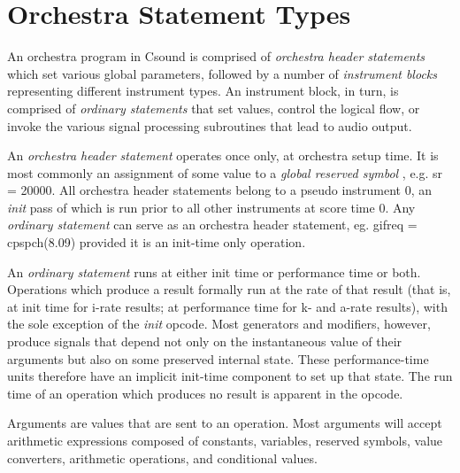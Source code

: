 \begin{comment}
\documentclass[10pt]{article}
\usepackage{fullpage, graphicx, url}
\setlength{\parskip}{1ex}
\setlength{\parindent}{0ex}
\title{Orchestra Statement Types}



\begin{tabular}{ccc}
The Alternative Csound Reference Manual & & \\
Previous &Syntax of the Orchestra &Next

\end{tabular}

\end{comment}
\section{Orchestra Statement Types}


  An orchestra program in Csound is comprised of \emph{orchestra header statements}
 which set various global parameters, followed by a number of \emph{instrument blocks}
 representing different instrument types. An instrument block, in turn, is comprised of \emph{ordinary statements}
 that set values, control the logical flow, or invoke the various signal processing subroutines that lead to audio output. 


 An \emph{orchestra header statement}
 operates once only, at orchestra setup time. It is most commonly an assignment of some value to a \emph{global reserved symbol}
 , e.g. sr = 20000. All orchestra header statements belong to a pseudo instrument 0, an \emph{init}
 pass of which is run prior to all other instruments at score time 0. Any \emph{ordinary statement}
 can serve as an orchestra header statement, eg. gifreq = cpspch(8.09) provided it is an init-time only operation. 


 An \emph{ordinary statement}
 runs at either init time or performance time or both. Operations which produce a result formally run at the rate of that result (that is, at init time for i-rate results; at performance time for k- and a-rate results), with the sole exception of the \emph{init}
 opcode. Most generators and modifiers, however, produce signals that depend not only on the instantaneous value of their arguments but also on some preserved internal state. These performance-time units therefore have an implicit init-time component to set up that state. The run time of an operation which produces no result is apparent in the opcode. 


 Arguments are values that are sent to an operation. Most arguments will accept arithmetic expressions composed of constants, variables, reserved symbols, value converters, arithmetic operations, and conditional values. 


\begin{comment}
\begin{tabular}{lcr}
Previous &Home &Next \\
Nomenclature &Up &Constants and Variables

\end{tabular}



\end{comment}
